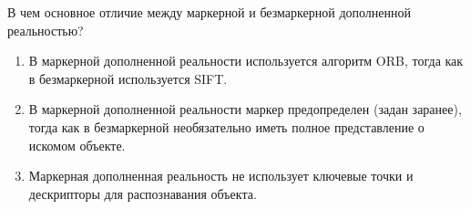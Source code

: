 
В чем основное отличие между маркерной и безмаркерной дополненной реальностью?

\begin{enumerate}
    \item В маркерной дополненной реальности используется алгоритм ORB, тогда как в безмаркерной используется SIFT.
    \item В маркерной дополненной реальности маркер предопределен (задан заранее), тогда как в безмаркерной необязательно иметь полное представление о искомом объекте.
    \item Маркерная дополненная реальность не использует ключевые точки и дескрипторы для распознавания объекта.
\end{enumerate}

